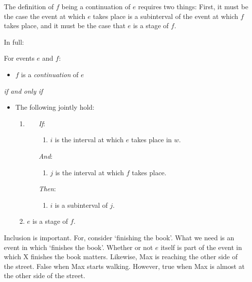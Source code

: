 \begin{note}
  The definition of \(f\) being a continuation of \(e\) requires two things:
  First, it must be the case the event at which \(e\) takes place is a subinterval of the event at which \(f\) takes place, and it must be the case that \(e\) is a stage of \(f\).

  In full:

  \begin{definition}[Continuations]
    \label{def:Landman:conts}
    For events \(e\) and \(f\):
    \begin{itemize}
    \item \(f\) is a \emph{continuation} of \(e\)
    \end{itemize}
    \emph{if and only if}
    \begin{itemize}
    \item
      The following jointly hold:
      \begin{enumerate}[label=\alph*., ref=(\alph*)]
      \item
        \label{def:Landman:conts:interval}
        \begin{enumerate}
        \item[\emph{If}:]
          \begin{enumerate}[label=\roman*.]
          \item
            \(i\) is the interval at which \(e\) takes place in \(w\).
          \end{enumerate}
        \item[\emph{And}:]
          \begin{enumerate}[label=\roman*., resume]
          \item
            \(j\) is the interval at which \(f\) takes place.
          \end{enumerate}
        \item[\emph{Then}:]
          \begin{enumerate}[label=\roman*., resume]
          \item
            \(i\) is a subinterval of \(j\).
          \end{enumerate}
        \end{enumerate}
      \item
        \label{def:Landman:conts:stage}
        \(e\) is a stage of \(f\).
      \end{enumerate}
    \end{itemize}
    \vspace{-\baselineskip}
  \end{definition}

  Inclusion is important.
  For, consider `finishing the book'.
  What we need is an event in which `finishes the book'.
  Whether or not \(e\) itself is part of the event in which X finishes the book matters.
  Likewise, Max is reaching the other side of the street.
  False when Max starts walking.
  However, true when Max is almost at the other side of the street.
\end{note}

